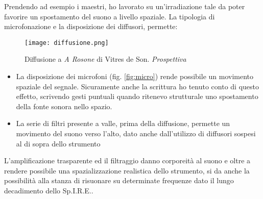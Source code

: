 Prendendo ad esempio i maestri, ho lavorato su un'irradiazione tale da poter favorire un spostamento del suono a livello spaziale. La tipologia di microfonazione e la disposizione dei diffusori, permette:

\begin{figure}[htbp]
\begin{center}
\texttt{[image: diffusione.png]}
\caption{Diffusione a \textit{A Rosone} di Vitres de Son. \textit{Prospettiva}}
\label{fig:prosp}
\end{center}
\end{figure}

\begin{itemize}
\item{La disposizione dei microfoni (fig. \ref{fig:micro}) rende possibile un movimento spaziale del segnale. Sicuramente anche la scrittura ho tenuto conto di questo effetto, scrivendo gesti puntuali quando ritenevo strutturale uno spostamento della fonte sonora nello spazio.}
\item{La serie di filtri presente a valle, prima della diffusione, permette un movimento del suono verso l'alto, dato anche dall'utilizzo di diffusori sospesi al di sopra dello strumento}
\end{itemize}

L'amplificazione trasparente ed il filtraggio danno corporeità al suono e oltre a rendere possibile una spazializzazione realistica dello strumento, si da anche la possibilità alla stanza di risuonare su determinate frequenze dato il lungo decadimento dello Sp.I.R.E..
